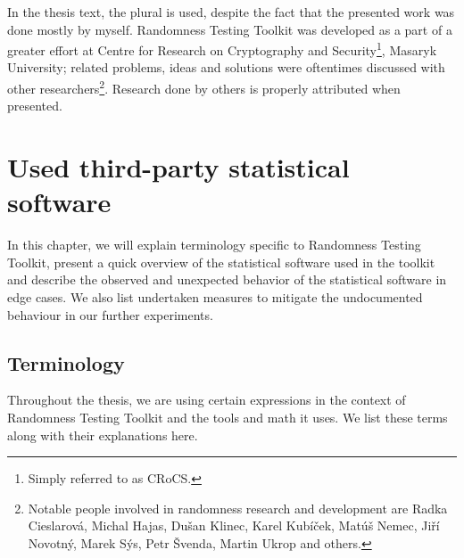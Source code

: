 \documentclass[
	digital,    %
	oneside,    %
	color,
	11pt,
	nocover,
	notable,
	nolof,
	nolot,
]{fithesis3}
\theoremstyle{definition}
\theoremstyle{remark}
\begin{document}
In the thesis text, the plural is used, despite the fact that the presented work was done mostly by myself. Randomness Testing Toolkit was developed as a part of a greater effort at Centre for Research on Cryptography and Security\footnote{Simply referred to as CRoCS.}, Masaryk University; related problems, ideas and solutions were oftentimes discussed with other researchers\footnote{Notable people involved in randomness research and development are Radka Cieslarová, Michal Hajas, Dušan Klinec, Karel Kubíček, Matúš Nemec, Jiří Novotný, Marek Sýs, Petr Švenda, Martin Ukrop and others.}. Research done by others is properly attributed when presented.

\chapter{Used third-party statistical software}
\label{chap:batteries}
In this chapter, we will explain terminology specific to Randomness Testing Toolkit, present a quick overview of the statistical software used in the toolkit and describe the observed and unexpected behavior of the statistical software in edge cases. We also list undertaken measures to mitigate the undocumented behaviour in our further experiments.

\section{Terminology}
\label{sec:terminology}
Throughout the thesis, we are using certain expressions in the context of Randomness Testing Toolkit and the tools and math it uses. We list these terms along with their explanations here.
\end{document}
